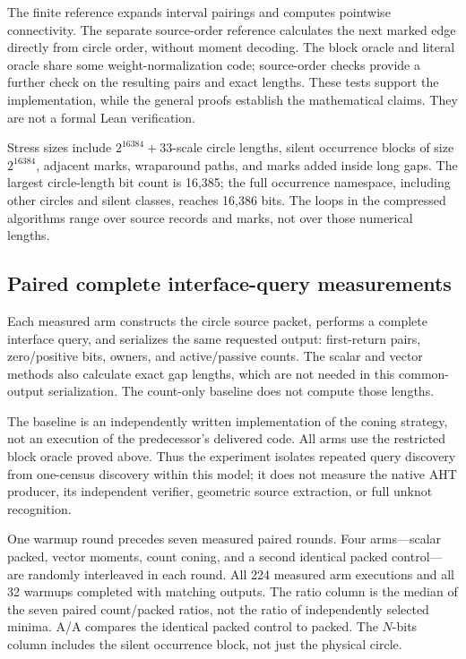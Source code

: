 \documentclass[11pt]{article}
\theoremstyle{definition}\newtheorem{definition}[theorem]{Definition}\newtheorem{example}[theorem]{Example}
\theoremstyle{remark}\newtheorem{remark}[theorem]{Remark}
\begin{document}
The finite reference expands interval pairings and computes pointwise connectivity. The separate source-order reference calculates the next marked edge directly from circle order, without moment decoding. The block oracle and literal oracle share some weight-normalization code; source-order checks provide a further check on the resulting pairs and exact lengths. These tests support the implementation, while the general proofs establish the mathematical claims. They are not a formal Lean verification.

Stress sizes include $2^{16384}+33$-scale circle lengths, silent occurrence blocks of size $2^{16384}$, adjacent marks, wraparound paths, and marks added inside long gaps. The largest circle-length bit count is 16,385; the full occurrence namespace, including other circles and silent classes, reaches 16,386 bits. The loops in the compressed algorithms range over source records and marks, not over those numerical lengths.

\subsection{Paired complete interface-query measurements}
Each measured arm constructs the circle source packet, performs a complete interface query, and serializes the same requested output: first-return pairs, zero/positive bits, owners, and active/passive counts. The scalar and vector methods also calculate exact gap lengths, which are not needed in this common-output serialization. The count-only baseline does not compute those lengths.

The baseline is an independently written implementation of the coning strategy, not an execution of the predecessor's delivered code. All arms use the restricted block oracle proved above. Thus the experiment isolates repeated query discovery from one-census discovery within this model; it does not measure the native AHT producer, its independent verifier, geometric source extraction, or full unknot recognition.

One warmup round precedes seven measured paired rounds. Four arms---scalar packed, vector moments, count coning, and a second identical packed control---are randomly interleaved in each round. All 224 measured arm executions and all 32 warmups completed with matching outputs. The ratio column is the median of the seven paired count/packed ratios, not the ratio of independently selected minima. A/A compares the identical packed control to packed. The $N$-bits column includes the silent occurrence block, not just the physical circle.
\end{document}
